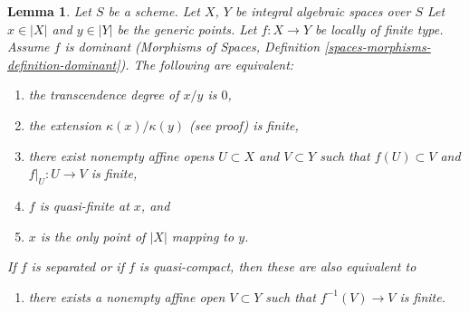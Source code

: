 \documentclass[10pt,a4paper]{amsart}
\theoremstyle{plain}
\newtheorem{lemma}[subsection]{Lemma}
\theoremstyle{definition}
\theoremstyle{remark}
\numberwithin{equation}{subsection}
\begin{document}
\begin{lemma}
\label{lemma-finite-degree}
Let $S$ be a scheme. Let $X$, $Y$ be integral algebraic spaces over $S$
Let $x \in |X|$ and $y \in |Y|$ be the generic points. Let $f : X \to Y$
be locally of finite type. Assume $f$ is dominant
(Morphisms of Spaces, Definition \ref{spaces-morphisms-definition-dominant}).
The following are equivalent:
\begin{enumerate}
\item the transcendence degree of $x/y$ is $0$,
\item the extension $\kappa(x)/\kappa(y)$ (see proof) is finite,
\item there exist nonempty affine opens $U \subset X$ and $V \subset Y$
such that $f(U) \subset V$ and $f|_U : U \to V$ is finite,
\item $f$ is quasi-finite at $x$, and
\item $x$ is the only point of $|X|$ mapping to $y$.
\end{enumerate}
If $f$ is separated or if $f$ is quasi-compact, then these are
also equivalent to
\begin{enumerate}
\item[(6)] there exists a nonempty affine open $V \subset Y$ such
that $f^{-1}(V) \to V$ is finite.
\end{enumerate}
\end{lemma}
\end{document}
